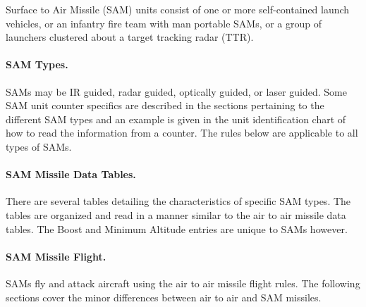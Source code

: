 




\label{rule:sams}

Surface to Air Missile (SAM) units consist of one or more self-contained launch vehicles, or an infantry fire team with man portable SAMs, or a group of launchers clustered about a target tracking radar (TTR).

\paragraph{SAM Types.} SAMs may be IR guided, radar guided, optically guided, or laser guided. Some SAM unit counter specifics are described in the sections pertaining to the different SAM types and an example is given in the unit identification chart of how to read the information from a counter. The rules below are applicable to all types of SAMs.

\paragraph{SAM Missile Data Tables.} There are several tables detailing the characteristics of specific SAM types. The tables are organized and read in a manner similar to the air to air missile data tables. The Boost and Minimum Altitude entries are unique to SAMs however.

\paragraph{SAM Missile Flight.} SAMs fly and attack aircraft using the air to air missile flight rules. The following sections cover the minor differences between air to air and SAM missiles.



